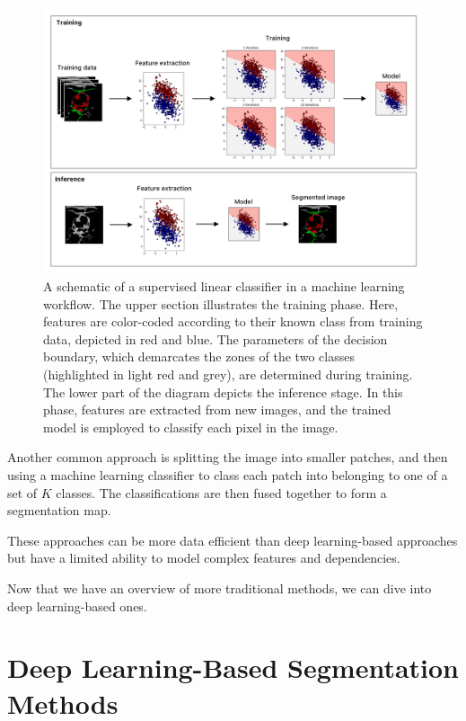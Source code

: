 \begin{figure}[h]
 \centering
 \includegraphics[width=\linewidth]{images/machine_learning.png}
 \caption{A schematic of a supervised linear classifier in a machine learning workflow. The upper section illustrates the training phase. Here, features are color-coded according to their known class from training data, depicted in red and blue. The parameters of the decision boundary, which demarcates the zones of the two classes (highlighted in light red and grey), are determined during training. The lower part of the diagram depicts the inference stage. In this phase, features are extracted from new images, and the trained model is employed to classify each pixel in the image. \cite{bencevicRecentProgressEpicardial2022}}
 \label{fig:machine-learning}
 \end{figure}

Another common approach is splitting the image into smaller patches, and then using a machine learning classifier to class each patch into belonging to one of a set of $K$ classes. The classifications are then fused together to form a segmentation map.

These approaches can be more data efficient than deep learning-based approaches \cite{bencevicRecentProgressEpicardial2022} but have a limited ability to model complex features and dependencies. 

Now that we have an overview of more traditional methods, we can dive into deep learning-based ones.

\section{Deep Learning-Based Segmentation Methods}

